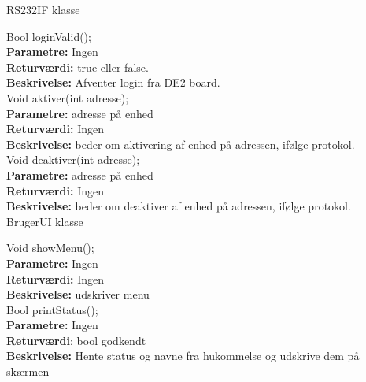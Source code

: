 {\centering RS232IF klasse}

Bool loginValid(); \\
\textbf{Parametre:} Ingen \\
\textbf{Returværdi:} true eller false. \\
\textbf{Beskrivelse:} Afventer login fra DE2 board. \\

Void aktiver(int adresse); \\
\textbf{Parametre:} adresse på enhed \\
\textbf{Returværdi:} Ingen \\
\textbf{Beskrivelse:} beder om aktivering af enhed på adressen, ifølge protokol. \\

Void deaktiver(int adresse); \\
\textbf{Parametre:} adresse på enhed \\
\textbf{Returværdi:} Ingen \\
\textbf{Beskrivelse:} beder om deaktiver af enhed på adressen, ifølge protokol. \\

{\centering BrugerUI klasse}

Void showMenu(); \\
\textbf{Parametre:} Ingen \\
\textbf{Returværdi:} Ingen \\
\textbf{Beskrivelse:} udskriver menu \\

Bool printStatus(); \\
\textbf{Parametre:} Ingen \\
\textbf{Returværdi}: bool godkendt \\
\textbf{Beskrivelse:} Hente status og navne fra hukommelse og udskrive dem på skærmen \\












